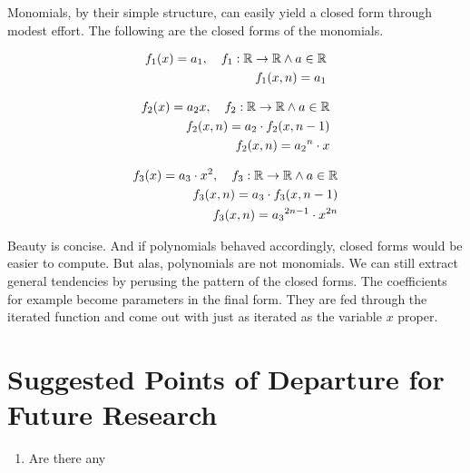 Monomials, by their simple structure, can easily yield a closed form through
modest effort. The following are the closed forms of the monomials.

\begin{align}
    f_1(x) = a_1, \quad f_1: \mathbb{R} \rightarrow \mathbb{R} \land a \in \mathbb{R} \notag \\
    f_1(x,n) = a_1
\end{align}

\begin{align}
    f_2(x) = a_2x, \quad f_2: \mathbb{R} \rightarrow \mathbb{R} \land a \in \mathbb{R} \notag \\
    f_2(x,n) = a_2 \cdot f_2(x,n-1) \notag                                                    \\
    f_2(x,n) = {a_2}^{n} \cdot x
\end{align}

\begin{align}
    f_3(x) = a_3 \cdot x^2, \quad f_3: \mathbb{R} \rightarrow \mathbb{R} \land a \in \mathbb{R} \notag \\
    f_3(x,n) = a_3 \cdot f_3(x,n-1) \notag                                                             \\
    f_3(x,n) = {a_3}^{2n - 1} \cdot x^{2n}
\end{align}

Beauty is concise. And if polynomials behaved accordingly, closed forms would
be easier to compute. But alas, polynomials are not monomials. We can still
extract general tendencies by perusing the pattern of the closed forms. The
coefficients for example become parameters in the final form. They are fed
through the iterated function and come out with just as iterated as the
variable $x$ proper.

\section{Suggested Points of Departure for Future Research}
\begin{enumerate}
    \item Are there any
\end{enumerate}